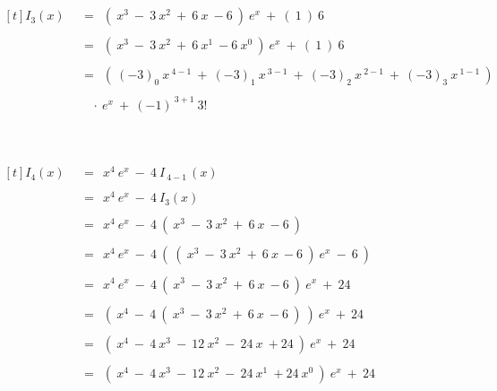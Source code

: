 	~\\~\\
	
	$\begin{aligned}[t]
	I_3(x) ~~ &= ~~ \left( ~ x^3 ~ - ~ 3 ~ x^2 ~ + ~ 6 ~ x ~ - 6 ~ \right) ~ e^x ~ + ~ \left( ~ 1 ~ \right) ~ 6 \\ \\
	&= ~~ \left( ~ x^3 ~ - ~ 3 ~ x^2 ~ + ~ 6 ~ x^1 ~ - 6 ~ x^0 ~ \right) ~ e^x ~ + ~ \left( ~ 1 ~ \right) ~ 6 \\ \\
	&= ~~ \left( ~ (-3)_0 ~ x^{~ 4 - 1} ~ + ~ (-3)_1 ~ x^{~ 3 - 1} ~ + ~ (-3)_2 ~ x^{~ 2 - 1} ~ + ~ (-3)_3 ~ x^{~ 1 - 1} ~ \right) \\ \\
	& ~~~~ \cdot ~ e^x ~ + ~ \left( -1 \right)^{~ 3 + 1} ~ 3!
	\end{aligned}$
	
	~\\~\\
	
	$\begin{aligned}[t]
	I_4(x) ~~ &= ~~ x^4 ~ e^{x} ~ - ~ 4 ~ I_{~ 4 - 1 ~}(x) \\ \\
	&= ~~ x^4 ~ e^{x} ~ - ~ 4 ~ I_{3}(x) \\ \\
	&= ~~ x^4 ~ e^{x} ~ - ~ 4 ~ \left( ~ x^3 ~ - ~ 3 ~ x^2 ~ + ~ 6 ~ x ~ - 6 ~ \right) \\ \\
	&= ~~ x^4 ~ e^{x} ~ - ~ 4 ~ \left( ~ \left( ~ x^3 ~ - ~ 3 ~ x^2 ~ + ~ 6 ~ x ~ - 6 ~ \right) ~ e^x ~ - ~ 6 ~ \right) \\ \\
	&= ~~ x^4 ~ e^{x} ~ - ~ 4 ~ \left( ~ x^3 ~ - ~ 3 ~ x^2 ~ + ~ 6 ~ x ~ - 6 ~ \right) ~ e^x ~ + ~ 24 \\ \\
	&= ~~ \left( ~ x^4 ~ - ~ 4 ~ \left( ~ x^3 ~ - ~ 3 ~ x^2 ~ + ~ 6 ~ x ~ - 6 ~ \right) ~ \right) ~ e^x ~ + ~ 24 \\ \\
	&= ~~ \left( ~ x^4 ~ - ~ 4 ~ x^3 ~- ~ 12 ~ x^2 ~ - ~ 24 ~ x ~ + 24 ~ \right) ~ e^x ~ + ~ 24 \\ \\
	&= ~~ \left( ~ x^4 ~ - ~ 4 ~ x^3 ~- ~ 12 ~ x^2 ~ - ~ 24 ~ x^1 ~ + 24 ~ x^0 ~ \right) ~ e^x ~ + ~ 24
	\end{aligned}$
	
	~\\
	
